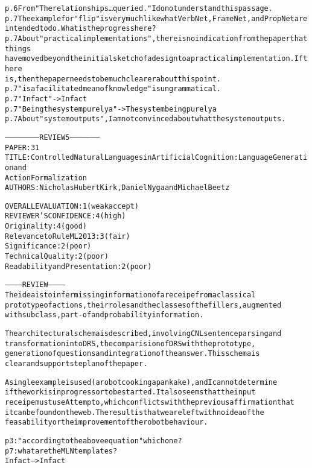 \documentclass[oribibl]{llncs}
\newcommand{\tick}{{\color{red}\ding{52}}}
\begin{document}
\begin{alltt}
p. 6 From "The relationships…queried."  I do not understand this passage. \tick
p. 7 The example for "flip" is very much like what VerbNet, FrameNet, and PropNet are 
intended to do.  What is the progress here? \tick
p. 7 About "practical implementations", there is no indication from the paper that things 
have moved beyond the initial sketch of a design to a practical implementation.  If there 
is, then the paper needs to be much clearer about this point. \tick
p. 7 "is a facilitated mean of knowledge" is ungrammatical. \tick
p. 7 "Infact" -> In fact \tick
p. 7 "Being the system purely a" -> The system being purely a \tick
p. 7 About "system outputs", I am not convinced about what the system outputs. \tick


----------------------- REVIEW 5 ---------------------
PAPER: 31
TITLE: Controlled Natural Languages in Artificial Cognition: Language Generation and 
Action Formalization
AUTHORS: Nicholas Hubert Kirk, Daniel Nyga and Michael Beetz

OVERALL EVALUATION: 1 (weak accept)
REVIEWER'S CONFIDENCE: 4 (high)
Originality: 4 (good)
Relevance to RuleML 2013: 3 (fair)
Significance: 2 (poor)
Technical Quality: 2 (poor)
Readability and Presentation: 2 (poor)

----------- REVIEW -----------
The idea is to infer missing information of a receipe from a classical
prototype of actions, their roles and the classes of the fillers, augmented
with subclass, part-of and probability information.

The architectural schema is described, involving CNL sentence parsing and
transformation into DRS, the comparision of DRS with the prototype,
generation of questions and integration of the answer. This schema is
clear and supports te plan of the paper.

A single example is used (a robot cooking a pankake), and I cannot determine
if the work is in progress or to be started. It also seems that the input
receipe must use Attempto, which conflicts with the previous affirmation that
it can be found on the web. The result is that we are left with no idea of the
feasability or the improvement of the robot behaviour.

p3:" according to the above equation"  which one ? \tick
p7: what are the MLN templates ? \tick
Infact --> In fact \tick

\end{alltt}
\end{document}
